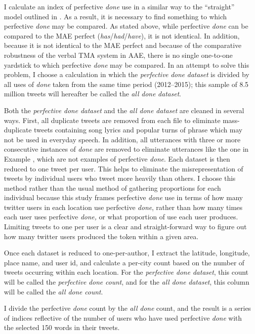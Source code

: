 \documentclass[output=paper,draftmode,colorlinks,citecolor=brown]{langscibook}
\begin{document}
I calculate an index of perfective \textit{done} use in a similar way to the “straight” model outlined in \citep{RickfordEtAl1991}. As a result, it is necessary to find something to which perfective \textit{done} may be compared. As stated above, while perfective \textit{done} can be compared to the MAE perfect (\textit{has}/\textit{had}/\textit{have}), it is not identical. In addition, because it is not identical to the MAE perfect and because of the comparative robustness of the verbal TMA system in AAE, there is no single one-to-one yardstick to which perfective \textit{done} may be compared. In an attempt to solve this problem, I choose a calculation in which the \textit{perfective} \textit{done} \textit{dataset} is divided by all uses of \textit{done} taken from the same time period (2012--2015); this sample of 8.5 million tweets will hereafter be called the \textit{all done dataset}.

Both the \textit{perfective done dataset} and the \textit{all done dataset} are cleaned in several ways. First, all duplicate tweets are removed from each file to eliminate mass-duplicate tweets containing song lyrics and popular turns of phrase which may not be used in everyday speech. In addition, all utterances with three or more consecutive instances of \textit{done} are removed to eliminate utterances like the one in Example , which are not examples of perfective \textit{done}. Each dataset is then reduced to one tweet per user. This helps to eliminate the misrepresentation of tweets by individual users who tweet more heavily than others. I choose this method rather than the usual method of gathering proportions for each individual because this study frames perfective \textit{done} use in terms of how many twitter users in each location use perfective \textit{done}, rather than how many times each user uses perfective \textit{done,} or what proportion of use each user produces. Limiting tweets to one per user is a clear and straight-forward way to figure out how many twitter users produced the token within a given area.

Once each dataset is reduced to one-per-author, I extract the latitude, longitude, place name, and user id, and calculate a per-city count based on the number of tweets occurring within each location. For the \textit{perfective done dataset}, this count will be called the \textit{perfective done count}, and for the \textit{all done dataset}, this column will be called the \textit{all done count}.

I divide the perfective \textit{done} count by the \textit{all done} count, and the result is a series of indices reflective of the number of users who have used perfective \textit{done} with the selected 150 words in their tweets.
\end{document}
